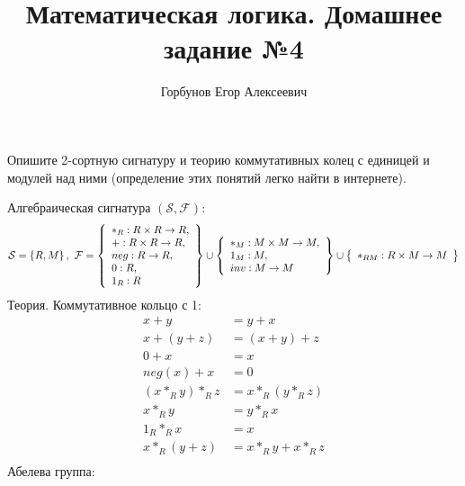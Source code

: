 
\title{Математическая логика. Домашнее задание №4}
\author{Горбунов Егор Алексеевич}


\maketitle

\begin{task}[1]
Опишите 2-сортную сигнатуру и теорию коммутативных колец с единицей и модулей над ними (определение этих понятий легко найти в интернете).
\end{task} 
\begin{solution}
Алгебраическая сигнатура $(\mathcal{S}, \mathcal{F})$:
\[
	\mathcal{S} = \left\lbrace R, M \right\rbrace,\
	\mathcal{F} = 
		\left\lbrace 
			\begin{array}{l}
				  *_R: R\times R \rightarrow R, \\
	              +:R\times R \rightarrow R, \\
	              neg:R\rightarrow R,\\
	              0:R,\\
	              1_R:R
	        \end{array}
	     \right\rbrace
	    \cup
		\left\lbrace 
			\begin{array}{l}
				  *_M: M\times M \rightarrow M,\\
	              1_M:M,\\
	              inv:M\rightarrow M
	        \end{array}
	     \right\rbrace
	    \cup
		\left\lbrace 
			\begin{array}{l}
				  *_{RM}: R\times M \rightarrow M
	        \end{array}
	     \right\rbrace    
\]
Теория.
Коммутативное кольцо с 1:
\begin{equation*}
\begin{split}
	x + y &= y + x\\
	x + (y + z) &= (x + y) + z\\
	0 + x &= x\\
	neg(x) + x &= 0\\
	(x *_R y) *_R z &= x *_R (y *_R z)\\
	x *_R y &= y *_R x\\
	1_R *_R x &= x\\
	x *_R (y + z) &= x *_R y + x *_R z\\
\end{split}
\end{equation*}
Абелева группа:
\begin{equation*}
\begin{split}

\end{split}
\end{equation*}
\end{solution}
